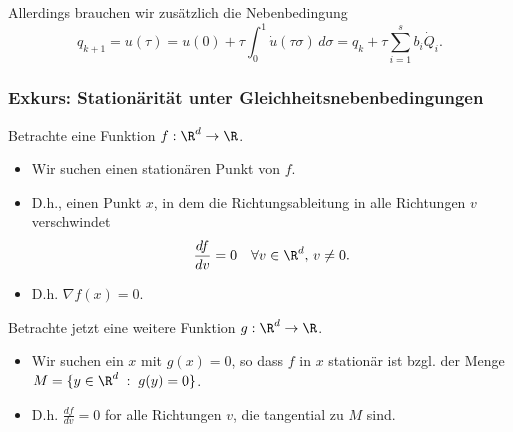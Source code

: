 \medskip

Allerdings brauchen wir zusätzlich die Nebenbedingung
\begin{equation}
\label{eq:vi_hoher_ordnung_nebenbedingung}
 q_{k+1}
 =
 u(\tau)
 =
 u(0) + \tau \int_0^1 \dot{u}(\tau \sigma)\,d\sigma
 =
 q_k+\tau\sum_{i=1}^s b_i \dot{Q}_i.
\end{equation}


\subsubsection{Exkurs: Stationärität unter Gleichheitsnebenbedingungen}

Betrachte eine Funktion $f:\R^d \to \R$.
\begin{itemize}
\item Wir suchen einen stationären Punkt von $f$.
\item D.h., einen Punkt $x$, in dem die Richtungsableitung in alle Richtungen $v$ verschwindet
\begin{equation*}
\frac{df}{dv} = 0 \quad\forall v\in\R^d,\,v\neq 0.
\end{equation*}
\begin{center}
\end{center}

\item D.h. $\nabla f(x) = 0$.
\end{itemize}
Betrachte jetzt eine weitere Funktion $g:\R^d\rightarrow\R$.
\begin{itemize}
\item Wir suchen ein $x$ mit $g(x)=0$, so dass $f$ in $x$ stationär ist bzgl. der Menge $M=\{y\in\R^d \; :\; g(y)=0\}$.
\item D.h. $\frac{df}{dv}=0$ for alle Richtungen $v$, die tangential zu $M$ sind.
\end{itemize}
\begin{center}
\end{center}
